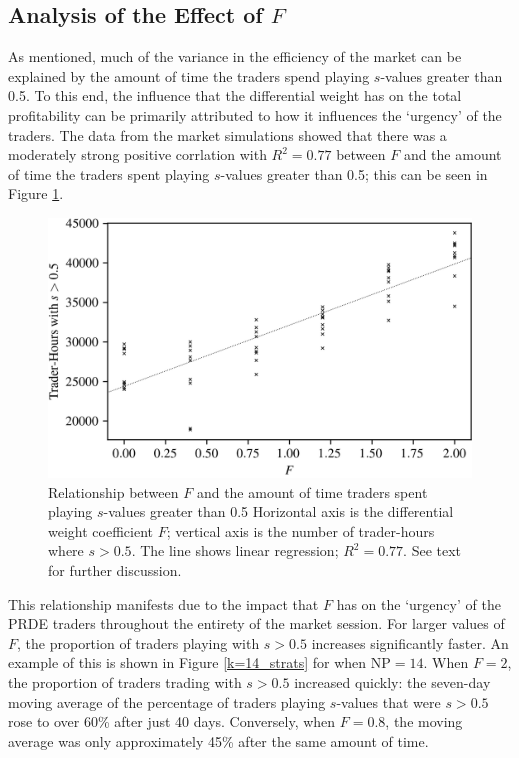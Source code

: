 \documentclass[conference]{IEEEtran}
\begin{document}
\subsection{Analysis of the Effect of $F$}

As mentioned, much of the variance in the efficiency of the market can be explained by the amount of time the traders spend playing $s$-values greater than 0.5.
To this end, the influence that the differential weight has on the total profitability can be primarily attributed to how it influences the `urgency' of the traders.
The data from the market simulations showed that there was a moderately strong positive corrlation with $R^2=0.77$ between $F$ and the amount of time the traders spent playing $s$-values greater than 0.5; this can be seen in Figure \ref{F_strats}.

\begin{figure}[htbp]
    \centerline{\includegraphics[width=\columnwidth]{F_strats.png}}
    \caption{
        Relationship between $F$ and the amount of time traders spent playing $s$-values greater than 0.5
        Horizontal axis is the differential weight coefficient $F$; vertical axis is the number of trader-hours where $s>0.5$.
        The line shows linear regression; $R^2=0.77$.
        See text for further discussion.
    }
    \label{F_strats}
\end{figure}

This relationship manifests due to the impact that $F$ has on the `urgency' of the PRDE traders throughout the entirety of the market session.
For larger values of $F$, the proportion of traders playing with $s>0.5$ increases significantly faster.
An example of this is shown in Figure \ref{k=14_strats} for when $\mathrm{NP}=14$.
When $F=2$, the proportion of traders trading with $s>0.5$ increased quickly: the seven-day moving average of the percentage of traders playing $s$-values that were $s>0.5$ rose to over 60\% after just 40 days.
Conversely, when $F=0.8$, the moving average was only approximately 45\% after the same amount of time.
\end{document}
